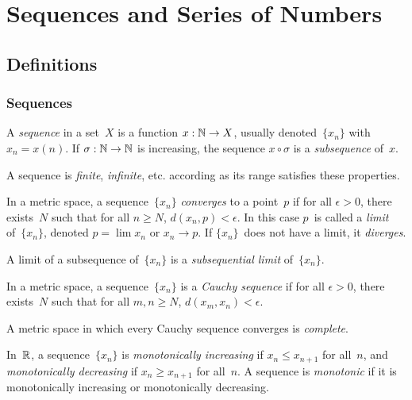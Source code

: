 %
%
%
\section{Sequences and Series of Numbers}
\subsection*{Definitions}
\subsubsection*{Sequences}
\begin{defn}
A \emph{sequence} in a set~\(X\) is a function \(x:\mathbb{N}\to X\), usually denoted~\(\{x_n\}\) with \(x_n=x(n)\). If \(\sigma:\mathbb{N}\to\mathbb{N}\) is increasing, the sequence \(x\circ\sigma\) is a \emph{subsequence} of~\(x\).

A sequence is \emph{finite}, \emph{infinite}, etc. according as its range satisfies these properties.
\end{defn}

\begin{defn}
In a metric space, a sequence~\(\{x_n\}\) \emph{converges} to a point~\(p\) if for all \(\epsilon>0\), there exists~\(N\) such that for all \(n\ge N\), \(d(x_n,p)<\epsilon\). In this case \(p\)~is called a \emph{limit} of~\(\{x_n\}\), denoted \(p=\lim x_n\) or \(x_n\to p\). If \(\{x_n\}\)~does not have a limit, it \emph{diverges}.

A limit of a subsequence of~\(\{x_n\}\) is a \emph{subsequential limit} of~\(\{x_n\}\).
\end{defn}

\begin{defn}
In a metric space, a sequence~\(\{x_n\}\) is a \emph{Cauchy sequence} if for all \(\epsilon>0\), there exists~\(N\) such that for all \(m,n\ge N\), \(d(x_m,x_n)<\epsilon\).
\end{defn}

\begin{defn}
A metric space in which every Cauchy sequence converges is \emph{complete}.
\end{defn}

\begin{defn}
In~\(\mathbb{R}\), a sequence~\(\{x_n\}\) is \emph{monotonically increasing} if \(x_n\le x_{n+1}\) for all~\(n\), and \emph{monotonically decreasing} if \(x_n\ge x_{n+1}\) for all~\(n\). A sequence is \emph{monotonic} if it is monotonically increasing or monotonically decreasing.
\end{defn}

